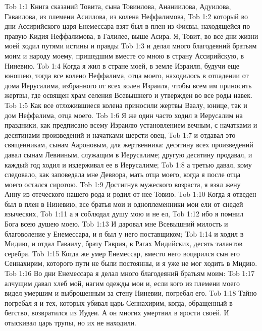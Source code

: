 \vs Tob 1:1 Книга сказаний Товита, сына Товиилова, Ананиилова, Адуилова, Гаваилова, из племени Асиилова, из колена Неффалимова,
\vs Tob 1:2 который во дни Ассирийского царя Енемессара взят был в плен из Фисвы, находящейся по правую  Кидия Неффалимова, в Галилее, выше Асира. Я, Товит, во все дни жизни моей ходил путями истины и правды
\vs Tob 1:3 и делал много благодеяний братьям моим и народу моему, пришедшим вместе со мною в страну Ассирийскую, в Ниневию.
\vs Tob 1:4 Когда я жил в стране моей, в земле Израиля, будучи еще юношею, тогда все колено Неффалима, отца моего, находилось в отпадении от дома Иерусалима, избранного от всех колен Израиля, чтобы всем им приносить  жертвы, где освящен храм селения Всевышнего и утвержден во все роды навек.
\vs Tob 1:5 Как все отложившиеся колена приносили жертвы Ваалу, юнице, так и дом Неффалима, отца моего.
\vs Tob 1:6 Я же один часто ходил в Иерусалим на праздники, как предписано всему Израилю установлением вечным, с начатками и десятинами произведений  и начатками шерсти овец,
\vs Tob 1:7 и отдавал это священникам, сынам Аароновым, для жертвенника: десятину всех произведений давал сынам Левииным, служащим в Иерусалиме; другую десятину продавал, и каждый год ходил и издерживал ее в Иерусалиме;
\vs Tob 1:8 а третью давал, кому следовало, как заповедала мне Деввора, мать отца моего, когда я после отца моего остался сиротою.
\vs Tob 1:9 Достигнув мужеского возраста, я взял жену Анну из отеческого нашего рода и родил от нее Товию.
\vs Tob 1:10 Когда я отведен был в плен в Ниневию, все братья мои и одноплеменники мои ели от снедей языческих,
\vs Tob 1:11 а я соблюдал душу мою и не ел,
\vs Tob 1:12 ибо я помнил Бога всею душею моею.
\vs Tob 1:13 И даровал мне Всевышний милость и благоволение у Енемессара, и я был у него поставщиком;
\vs Tob 1:14 и ходил в Мидию, и отдал  Гаваилу, брату Гаврия, в Рагах Мидийских, десять талантов серебра.
\vs Tob 1:15 Когда же умер Енемессар, вместо него воцарился сын его Сеннахирим, которого пути не были постоянны, и я уже не мог ходить в Мидию.
\vs Tob 1:16 Во дни Енемессара я делал много благодеяний братьям моим:
\vs Tob 1:17 алчущим давал хлеб мой, нагим одежды мои и, если кого из племени моего видел умершим и выброшенным за стену Ниневии, погребал его.
\vs Tob 1:18 Тайно погребал я и тех, которых убивал царь Сеннахирим, когда, обращенный в бегство, возвратился из Иудеи. А он многих умертвил в ярости своей. И отыскивал царь трупы, но их не находили.
